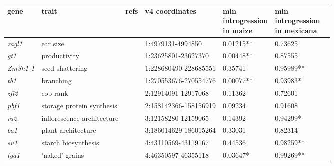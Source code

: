 \begin{sidewaystable}[ht]
\centering
\begin{tabular}{lllllll}
  \hline
gene & trait & refs & v4 coordinates & \makecell{min\\ introgression
\\ in maize} & \makecell{min\\ introgression\\
 in mexicana} \\ 
  \hline
 
\textit{zagl1} & ear size & \cite{Wills:2018_zagl1} & 1:4979131-4994850 &  0.01215** & 0.73625 \\ 

\textit{gt1} & productivity & \cite{Wills:2013_gt1} & 1:23625801-23627370 & 0.00448** & 0.87555  \\ 

\textit{ZmSh1-1} & seed shattering & \cite{Lin:2012_shattering} & 1:228680490-228685551 & 0.35741 & 0.95989** \\ 

\textit{tb1} & branching & \cite{Doebley_Stec_Gustus:1995_tb1, Doebley_Stec_Hubbard:1997_tb1, Dong:2019_reg_domestication} & 1:270553676-270554776 & 0.00077** & 0.93983* \\ 

\textit{zfl2} & cob rank & \cite{Doebley_Stec:1991, Doebley_Stec:1993, Bomblies_Doebley:2006} & 2:12914091-12917068 & 0.11362 &  0.72601  \\ 

\textit{pbf1} & storage protein synthesis & \cite{Wang:1998_pbf} & 2:158142366-158156919 & 0.09234 & 0.91608 \\ 

\textit{ra2} & inflorescence architecture & \cite{Vollbrecht:2005_ramosa} & 3:12158280-12159065 & 0.14392 & 0.94299* \\ 

\textit{ba1} & plant architecture & \cite{Gallavotti:2004_ba1} & 3:186014629-186015264 & 0.33031 & 0.82314  \\ 

\textit{su1} & starch biosynthesis & \cite{Whitt:2002_starch} & 4:43110569-43119167 & 0.44536 & 0.98259** \\ 

\textit{tga1} & 'naked' grains & \cite{Dorweiler:1993, Wang:2005_tga1} & 4:46350597-46355118 & 0.03647* & 0.99269**  \\ 


\end{tabular}
\end{sidewaystable}
